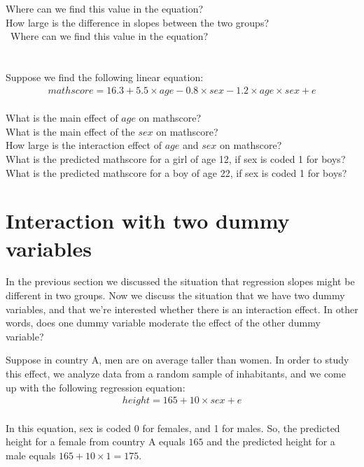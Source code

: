 Where can we find this value in the equation?\\
How large is the difference in slopes between the two groups?\\\
Where can we find this value in the equation?\\
\\
\\
Suppose we find the following linear equation:
\\
\begin{eqnarray} 
mathscore = 16.3 + 5.5  \times age - 0.8  \times sex - 1.2  \times age  \times sex + e \nonumber
\end{eqnarray}
\\
What is the main effect of $age$ on mathscore? \\
What is the main effect of the $sex$ on mathscore?\\
How large is the interaction effect of $age$ and $sex$ on mathscore?\\
What is the predicted mathscore for a girl of age 12, if sex is coded 1 for boys?\\
What is the predicted mathscore for a boy of age 22, if sex is coded 1 for boys?




\section{Interaction with two dummy variables}


In the previous section we discussed the situation that regression slopes might be different in two groups. Now we discuss the situation that we have two dummy variables, and that we're interested whether there is an interaction effect. In other words, does one dummy variable moderate the effect of the other dummy variable?

Suppose in country A, men are on average taller than women. In order to study this effect, we analyze data from a random sample of inhabitants, and we come up with the following regression equation:
\\
\begin{eqnarray} 
height = 165 + 10  \times sex + e \nonumber
\end{eqnarray}
\\
In this equation, sex is coded 0 for females, and 1 for males. So, the predicted height for a female from country A equals $165$ and the predicted height for a male equals $165 + 10 \times 1 = 175$.\\


